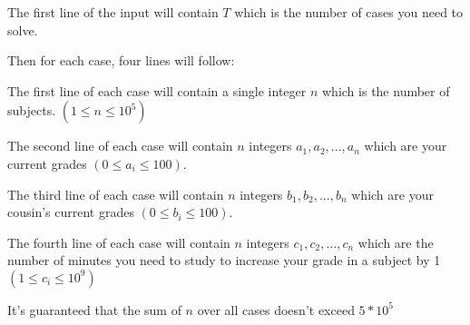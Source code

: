 The first line of the input will contain $T$ which is the number of cases you need to solve.

Then for each case, four lines will follow:

The first line of each case will contain a single integer $n$ which is the number of subjects. $(1 \le n \le 10^5)$

The second line of each case will contain $n$ integers $a_1,a_2,...,a_n$ which are your current grades $(0 \le a_i \le 100)$.

The third line of each case will contain $n$ integers $b_1,b_2,...,b_n$ which are your cousin's current grades $(0 \le b_i \le 100)$.

The fourth line of each case will contain $n$ integers $c_1,c_2,...,c_n$ which are the number of minutes you need to study to increase your grade in a subject by 1 $(1 \le c_i \le 10^9)$

It's guaranteed that the sum of $n$ over all cases doesn't exceed $5*10^5$